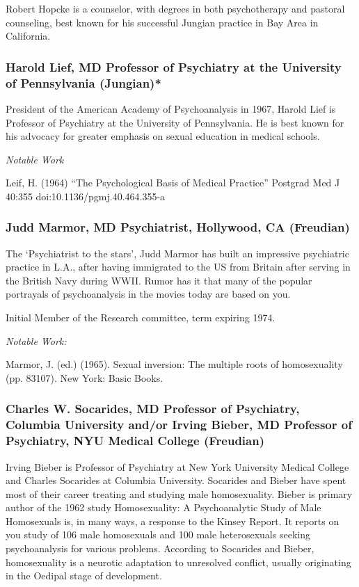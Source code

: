 Robert Hopcke is a counselor, with degrees in both psychotherapy and pastoral counseling, best known for his successful Jungian practice in Bay Area in California.

\subsubsection{Harold Lief, MD Professor of Psychiatry at the University of Pennsylvania (Jungian)*}
\label{haroldliefmdprofessorofpsychiatryattheuniversityofpennsylvaniajungian}

President of the American Academy of Psychoanalysis in 1967, Harold Lief is Professor of Psychiatry at the University of Pennsylvania. He is best known for his advocacy for greater emphasis on sexual education in medical schools.

\emph{Notable Work}

Leif, H. (1964) ``The Psychological Basis of Medical Practice'' Postgrad Med J 40:355 doi:10.1136\slash pgmj.40.464.355-a

\subsubsection{Judd Marmor, MD Psychiatrist, Hollywood, CA (Freudian)}
\label{juddmarmormdpsychiatristhollywoodcafreudian}

The `Psychiatrist to the stars', Judd Marmor has built an impressive psychiatric practice in L.A., after having immigrated to the US from Britain after serving in the British Navy during WWII. Rumor has it that many of the popular portrayals of psychoanalysis in the movies today are based on you.

Initial Member of the Research committee, term expiring 1974.

\emph{Notable Work:}

Marmor, J. (ed.) (1965). Sexual inversion: The multiple roots of homosexuality (pp. 83107). New York: Basic Books.

\subsubsection{Charles W. Socarides, MD Professor of Psychiatry, Columbia University and\slash or Irving Bieber, MD Professor of Psychiatry, NYU Medical College (Freudian)}
\label{charlesw.socaridesmdprofessorofpsychiatrycolumbiauniversityandorirvingbiebermdprofessorofpsychiatrynyumedicalcollegefreudian}

Irving Bieber is Professor of Psychiatry at New York University Medical College and Charles Socarides at Columbia University. Socarides and Bieber have spent most of their career treating and studying male homosexuality. Bieber is primary author of the 1962 study Homosexuality: A Psychoanalytic Study of Male Homosexuals is, in many ways, a response to the Kinsey Report. It reports on you study of 106 male homosexuals and 100 male heterosexuals seeking psychoanalysis for various problems. According to Socarides and Bieber, homosexuality is a neurotic adaptation to unresolved conflict, usually originating in the Oedipal stage of development.


